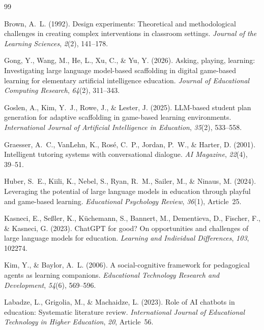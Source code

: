 \documentclass[11pt,a4paper]{article}
\begin{document}
\begin{thebibliography}{99}

Brown, A.~L. (1992). Design experiments: Theoretical and methodological challenges in creating complex interventions in classroom settings. \textit{Journal of the Learning Sciences}, \textit{2}(2), 141--178.

Gong, Y., Wang, M., He, L., Xu, C., \& Yu, Y. (2026). Asking, playing, learning: Investigating large language model-based scaffolding in digital game-based learning for elementary artificial intelligence education. \textit{Journal of Educational Computing Research}, \textit{64}(2), 311--343.

Goslen, A., Kim, Y.~J., Rowe, J., \& Lester, J. (2025). LLM-based student plan generation for adaptive scaffolding in game-based learning environments. \textit{International Journal of Artificial Intelligence in Education}, \textit{35}(2), 533--558.

Graesser, A.~C., VanLehn, K., Ros\'{e}, C.~P., Jordan, P.~W., \& Harter, D. (2001). Intelligent tutoring systems with conversational dialogue. \textit{AI Magazine}, \textit{22}(4), 39--51.

Huber, S.~E., Kiili, K., Nebel, S., Ryan, R.~M., Sailer, M., \& Ninaus, M. (2024). Leveraging the potential of large language models in education through playful and game-based learning. \textit{Educational Psychology Review}, \textit{36}(1), Article~25.

Kasneci, E., Se{\ss}ler, K., K\"{u}chemann, S., Bannert, M., Dementieva, D., Fischer, F., \& Kasneci, G. (2023). ChatGPT for good? On opportunities and challenges of large language models for education. \textit{Learning and Individual Differences}, \textit{103}, 102274.

Kim, Y., \& Baylor, A.~L. (2006). A social-cognitive framework for pedagogical agents as learning companions. \textit{Educational Technology Research and Development}, \textit{54}(6), 569--596.

Labadze, L., Grigolia, M., \& Machaidze, L. (2023). Role of AI chatbots in education: Systematic literature review. \textit{International Journal of Educational Technology in Higher Education}, \textit{20}, Article~56.


\end{thebibliography}
\end{document}
